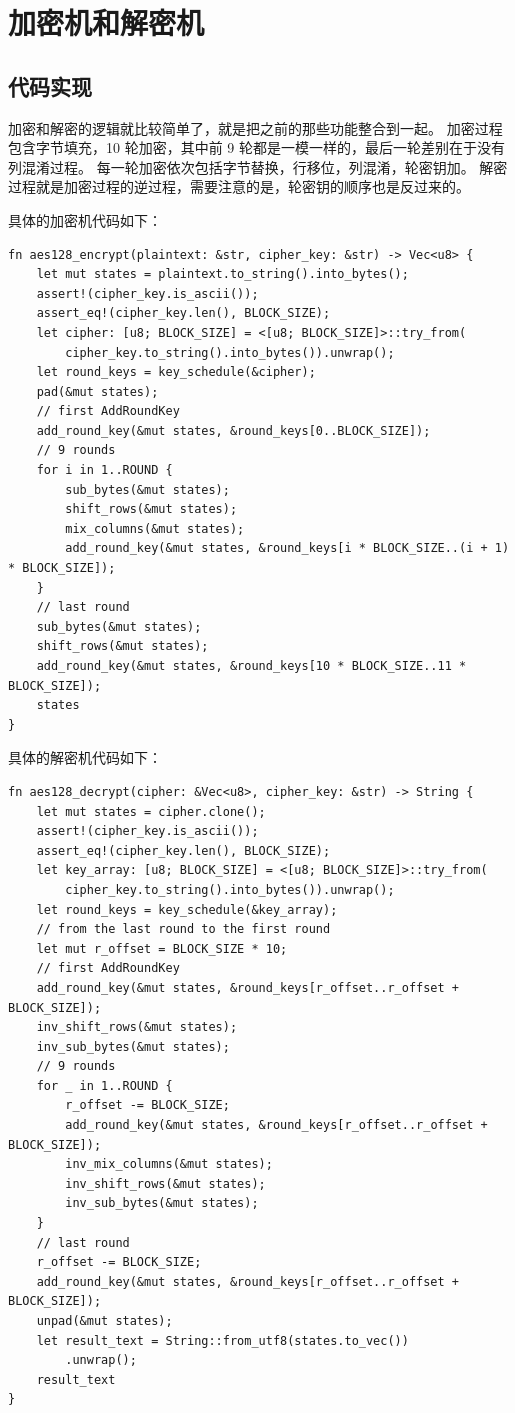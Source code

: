 \documentclass[degree=project,degree-type=project,cjk-font=noto]{thuthesis}
\begin{document}
\section{加密机和解密机}

\subsection{代码实现}

加密和解密的逻辑就比较简单了，就是把之前的那些功能整合到一起。
加密过程包含字节填充，10 轮加密，其中前 9 轮都是一模一样的，最后一轮差别在于没有列混淆过程。
每一轮加密依次包括字节替换，行移位，列混淆，轮密钥加。
解密过程就是加密过程的逆过程，需要注意的是，轮密钥的顺序也是反过来的。

具体的加密机代码如下：

  \begin{verbatim}
fn aes128_encrypt(plaintext: &str, cipher_key: &str) -> Vec<u8> {
    let mut states = plaintext.to_string().into_bytes();
    assert!(cipher_key.is_ascii());
    assert_eq!(cipher_key.len(), BLOCK_SIZE);
    let cipher: [u8; BLOCK_SIZE] = <[u8; BLOCK_SIZE]>::try_from(
        cipher_key.to_string().into_bytes()).unwrap();
    let round_keys = key_schedule(&cipher);
    pad(&mut states);
    // first AddRoundKey
    add_round_key(&mut states, &round_keys[0..BLOCK_SIZE]);
    // 9 rounds
    for i in 1..ROUND {
        sub_bytes(&mut states);
        shift_rows(&mut states);
        mix_columns(&mut states);
        add_round_key(&mut states, &round_keys[i * BLOCK_SIZE..(i + 1) * BLOCK_SIZE]);
    }
    // last round
    sub_bytes(&mut states);
    shift_rows(&mut states);
    add_round_key(&mut states, &round_keys[10 * BLOCK_SIZE..11 * BLOCK_SIZE]);
    states
}
\end{verbatim}

具体的解密机代码如下：

  \begin{verbatim}
fn aes128_decrypt(cipher: &Vec<u8>, cipher_key: &str) -> String {
    let mut states = cipher.clone();
    assert!(cipher_key.is_ascii());
    assert_eq!(cipher_key.len(), BLOCK_SIZE);
    let key_array: [u8; BLOCK_SIZE] = <[u8; BLOCK_SIZE]>::try_from(
        cipher_key.to_string().into_bytes()).unwrap();
    let round_keys = key_schedule(&key_array);
    // from the last round to the first round
    let mut r_offset = BLOCK_SIZE * 10;
    // first AddRoundKey
    add_round_key(&mut states, &round_keys[r_offset..r_offset + BLOCK_SIZE]);
    inv_shift_rows(&mut states);
    inv_sub_bytes(&mut states);
    // 9 rounds
    for _ in 1..ROUND {
        r_offset -= BLOCK_SIZE;
        add_round_key(&mut states, &round_keys[r_offset..r_offset + BLOCK_SIZE]);
        inv_mix_columns(&mut states);
        inv_shift_rows(&mut states);
        inv_sub_bytes(&mut states);
    }
    // last round
    r_offset -= BLOCK_SIZE;
    add_round_key(&mut states, &round_keys[r_offset..r_offset + BLOCK_SIZE]);
    unpad(&mut states);
    let result_text = String::from_utf8(states.to_vec())
        .unwrap();
    result_text
}
\end{verbatim}
\end{document}
